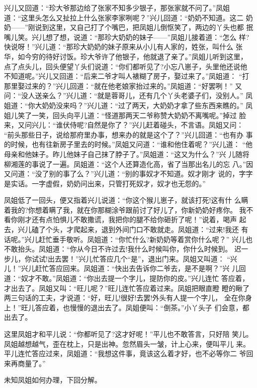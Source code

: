 兴儿又回道：“珍大爷那边给了张家不知多少银子，那张家就不问了。”凤姐
道：“这里头怎么又扯拉上什么张家李家咧呢？”兴儿回道：“奶奶不知道。这二
奶奶——”刚说到这里，又自己打了个嘴巴，把凤姐儿倒怄笑了，两边的丫头也都
抿嘴儿笑。兴儿想了想，说道：“那珍大奶奶的妹子——”凤姐儿接着道：“怎么
样?快说呀！”兴儿道：“那珍大奶奶的妹子原来从小儿有人家的，姓张，叫什么
张华，如今穷的待好讨饭。珍大爷许了他银子，他就退了亲了。”凤姐儿听到这里，
点了点头儿，回头便望丫头们说道：“你们都听见了?小忘八崽子，头里他还说他
不知道呢。”兴儿又回道：“后来二爷才叫人裱糊了房子，娶过来了。”凤姐道：
“打那里娶过来的？”兴儿回道：“就在他老娘家抬过来的。”凤姐道：“好罢咧！”
又问：“没人送亲么？”兴儿道：“就是蓉哥儿，还有几个丫头老婆子们，没别人。”
凤姐道：“你大奶奶没来吗？”兴儿道：“过了两天，大奶奶才拿了些东西来瞧的。”
凤姐儿笑了一笑，回头向平儿道：“怪道那两天二爷称赞大奶奶不离嘴呢。”掉过
脸来，又问兴儿：“谁伏侍呢?自然是你了？”兴儿赶着碰头，不言语。凤姐又问：
“前头那些日子，说给那府里办事，想来办的就是这个了？”兴儿回道：“也有办
事的时候，也有往新房子里去的时候。”凤姐又问道：“谁和他住着呢？”兴儿道：
“他母亲和他妹子。昨儿他妹子自己抹了脖子了。”凤姐道：“这又为什么？”兴
儿随将柳湘莲的事说了一遍。凤姐道：“这个人还算造化高，省了当那出名儿的忘
八。”因又问道：“没了别的事了么？”兴儿道：“别的事奴才不知道。奴才刚才
说的，字字是实话。一字虚假，奶奶问出来，只管打死奴才，奴才也无怨的。”

凤姐低了一回头，便又指着兴儿说道：“你这个猴儿崽子，就该打死!这有什
么瞒着我的?你想着瞒了我，就在你那糊涂爷跟前讨了好儿了，你新奶奶好疼你。
我不看你刚才还有点怕惧儿不敢撒谎，我把你的腿不给你砸折了呢！”说着，喝声
起去，兴儿磕了个头，才爬起来，退到外间门口不敢就走。凤姐道：“过来!我还
有话呢。”兴儿赶忙垂手敬听。凤姐道：“你忙什么?新奶奶等着赏你什么呢？”
兴儿也不敢抬头。凤姐道：“你从今日不许过去!我什么时候叫你，你什么时候到。
迟一步儿，你试试!出去罢！”兴儿忙答应几个“是”，退出门来。凤姐又叫道：
“兴儿！”兴儿赶忙答应回来。凤姐道：“快出去告诉你二爷去，是不是啊？”兴
儿回道：“奴才不敢。”凤姐道：“你出去提一个字儿，提防你的皮。”兴儿连忙
答应着，才出去了。凤姐又叫：“旺儿呢？”旺儿连忙答应着过来。凤姐把眼直瞪
瞪的瞅了两三句话的工夫，才说道：“好，旺儿!很好!去罢!外头有人提一个字儿，
全在你身上！”旺儿答应着，也慢慢的退出去了。凤姐便叫：“倒茶。”小丫头子
们会意，都出去了。

这里凤姐才和平儿说：“你都听见了?这才好呢！”平儿也不敢答言，只好陪
笑儿。凤姐越想越气，歪在枕上，只是出神。忽然眉头一皱，计上心来，便叫平儿
来。平儿连忙答应过来，凤姐道：“我想这件事，竟该这么着才好，也不必等你二
爷回来再商量了。”

未知凤姐如何办理，下回分解。
